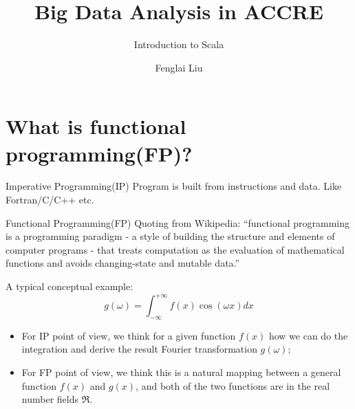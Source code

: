\documentclass[notheorems, aspectratio=54]{beamer}
\title[Big Data Analysis In ACCRE]{Big Data Analysis in ACCRE}
\subtitle{Introduction to Scala}
\author{Fenglai Liu}
\institute[ACCRE]{fenglai@accre.vanderbilt.edu}
\begin{document}
\begin{frame}
    \titlepage
\end{frame}


\section{What is functional programming(FP)?}
\begin{frame}

\begin{block}{Imperative Programming(IP)}
Program is built from instructions and data. Like Fortran/C/C++ etc.
\end{block}

\begin{block}{Functional Programming(FP)}
Quoting from Wikipedia: ``functional programming is a programming 
paradigm - a style of building the structure and elements of computer 
programs - that treats computation as the evaluation of mathematical 
functions and avoids changing-state and mutable data.''
\end{block}

\end{frame}

\begin{frame}

A typical conceptual example:
\begin{equation}
 g(\omega) = \int_{-\infty}^{+\infty} f(x)\cos(\omega x) dx
\end{equation}

\begin{itemize}
 \item For IP point of view, we think for a given function $f(x)$ how we can do the integration and 
 derive the result Fourier transformation $g(\omega)$;
 \item For FP point of view, we think this is a natural mapping between a general function $f(x)$
 and $g(x)$, and both of the two functions are in the real number fields $\Re$.
\end{itemize}

\end{frame}
\end{document}
